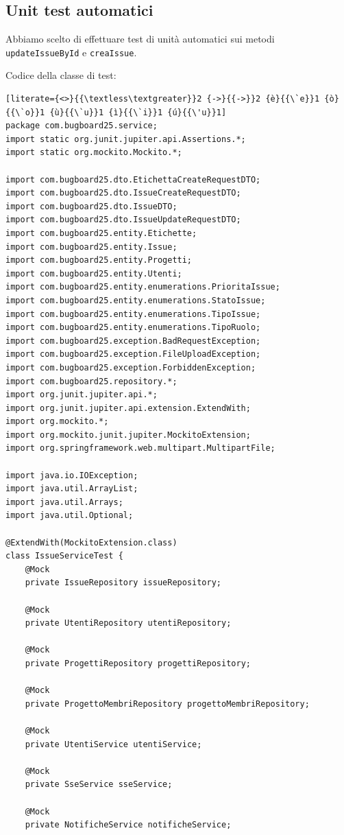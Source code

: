 \subsection{Unit test automatici}
Abbiamo scelto di effettuare test di unità automatici sui metodi \texttt{updateIssueById} e \texttt{creaIssue}.

Codice della classe di test:
\begin{lstlisting}[literate={<>}{{\textless\textgreater}}2 {->}{{->}}2 {è}{{\`e}}1 {ò}{{\`o}}1 {ù}{{\`u}}1 {ì}{{\`i}}1 {ú}{{\'u}}1]
package com.bugboard25.service;
import static org.junit.jupiter.api.Assertions.*;
import static org.mockito.Mockito.*;

import com.bugboard25.dto.EtichettaCreateRequestDTO;
import com.bugboard25.dto.IssueCreateRequestDTO;
import com.bugboard25.dto.IssueDTO;
import com.bugboard25.dto.IssueUpdateRequestDTO;
import com.bugboard25.entity.Etichette;
import com.bugboard25.entity.Issue;
import com.bugboard25.entity.Progetti;
import com.bugboard25.entity.Utenti;
import com.bugboard25.entity.enumerations.PrioritaIssue;
import com.bugboard25.entity.enumerations.StatoIssue;
import com.bugboard25.entity.enumerations.TipoIssue;
import com.bugboard25.entity.enumerations.TipoRuolo;
import com.bugboard25.exception.BadRequestException;
import com.bugboard25.exception.FileUploadException;
import com.bugboard25.exception.ForbiddenException;
import com.bugboard25.repository.*;
import org.junit.jupiter.api.*;
import org.junit.jupiter.api.extension.ExtendWith;
import org.mockito.*;
import org.mockito.junit.jupiter.MockitoExtension;
import org.springframework.web.multipart.MultipartFile;

import java.io.IOException;
import java.util.ArrayList;
import java.util.Arrays;
import java.util.Optional;

@ExtendWith(MockitoExtension.class)
class IssueServiceTest {
    @Mock
    private IssueRepository issueRepository;

    @Mock
    private UtentiRepository utentiRepository;

    @Mock
    private ProgettiRepository progettiRepository;

    @Mock
    private ProgettoMembriRepository progettoMembriRepository;

    @Mock
    private UtentiService utentiService;

    @Mock
    private SseService sseService;

    @Mock
    private NotificheService notificheService;


\end{lstlisting}
